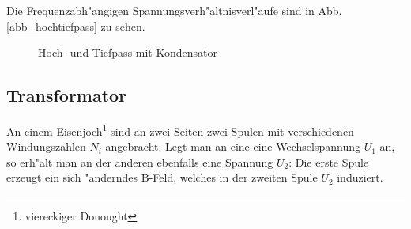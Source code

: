 \begin{Beispiel}
Die Frequenzabh"angigen Spannungsverh"altnisverl"aufe sind in
Abb. \ref{abb_hochtiefpass} zu sehen.


   \begin{figure}
      \centering
{}
      \caption{Hoch- und Tiefpass mit Kondensator}
      \label{abb_hoch-tiefpass_kond}
   \end{figure}
\end{Beispiel}






\subsection{Transformator}
\label{kap_transformator}

An einem Eisenjoch\footnote{viereckiger
  Donought} sind an zwei Seiten zwei Spulen mit verschiedenen
Windungszahlen $N_i$ angebracht. Legt man an eine eine Wechselspannung
$U_1$ an, so erh"alt man an der anderen ebenfalls eine Spannung $U_2$:
Die erste Spule erzeugt ein sich "anderndes B-Feld, welches in der
zweiten Spule $U_2$ induziert.


